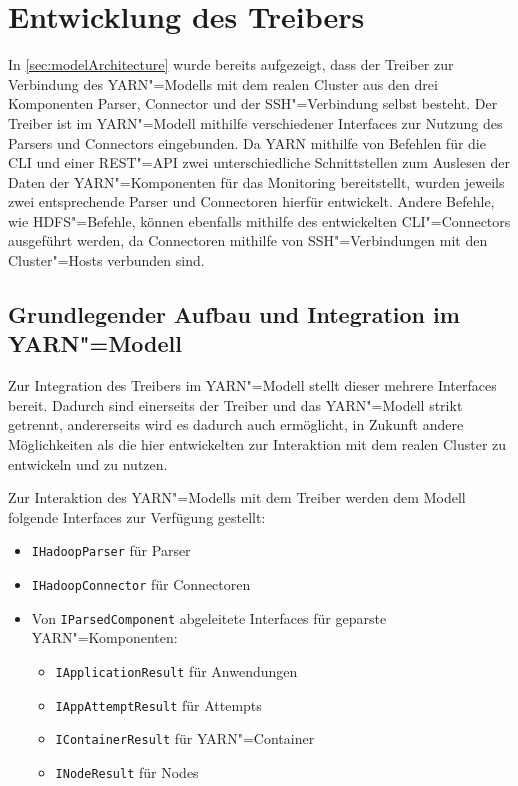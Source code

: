 \section{Entwicklung des Treibers}
\label{sec:sshDriver}

In \cref{sec:modelArchitecture} wurde bereits aufgezeigt, dass der Treiber zur Verbindung des YARN"=Modells mit dem realen Cluster aus den drei Komponenten Parser, Connector und der SSH"=Verbindung selbst besteht.
Der Treiber ist im YARN"=Modell mithilfe verschiedener Interfaces zur Nutzung des Parsers und Connectors eingebunden.
Da YARN mithilfe von Befehlen für die \gls{CLI} und einer REST"=API zwei unterschiedliche Schnittstellen zum Auslesen der Daten der YARN"=Komponenten für das Monitoring bereitstellt, wurden jeweils zwei entsprechende Parser und Connectoren hierfür entwickelt.
Andere Befehle, wie \zB HDFS"=Befehle, können ebenfalls mithilfe des entwickelten \gls{CLI}"=Connectors ausgeführt werden, da Connectoren mithilfe von SSH"=Verbindungen mit den Cluster"=Hosts verbunden sind.

\subsection{Grundlegender Aufbau und Integration im YARN"=Modell}
\label{subsec:driverModelIntegration}

Zur Integration des Treibers im YARN"=Modell stellt dieser mehrere Interfaces bereit.
Dadurch sind einerseits der Treiber und das YARN"=Modell strikt getrennt, andererseits wird es dadurch auch ermöglicht, in Zukunft andere Möglichkeiten als die hier entwickelten zur Interaktion mit dem realen Cluster zu entwickeln und zu nutzen.

Zur Interaktion des YARN"=Modells mit dem Treiber werden dem Modell folgende Interfaces zur Verfügung gestellt:

\begin{itemize}
    \item \texttt{IHadoopParser} für Parser
    \item \texttt{IHadoopConnector} für Connectoren
    \item Von \texttt{IParsedComponent} abgeleitete Interfaces für geparste YARN"=Komponenten:
    \begin{itemize}
        \item \texttt{IApplicationResult} für Anwendungen
        \item \texttt{IAppAttemptResult} für Attempts
        \item \texttt{IContainerResult} für YARN"=Container
        \item \texttt{INodeResult} für Nodes
    \end{itemize}
\end{itemize}

